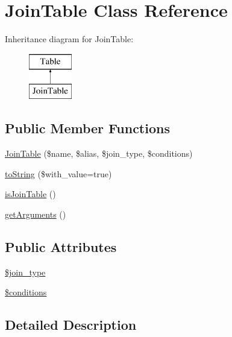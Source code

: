 \hypertarget{classJoinTable}{}\section{Join\+Table Class Reference}
\label{classJoinTable}
Inheritance diagram for Join\+Table\+:\begin{figure}[H]
\begin{center}
\leavevmode
\includegraphics[height=2.000000cm]{classJoinTable}
\end{center}
\end{figure}
\subsection*{Public Member Functions}
\begin{DoxyCompactItemize}
\item 
\hyperlink{classJoinTable_a70859ad638b9149e97b8209d4f73610e}{Join\+Table} (\$name, \$alias, \$join\+\_\+type, \$conditions)
\item 
\hyperlink{classJoinTable_aa1e393a7b04e3b591ebd0fe6dff46f42}{to\+String} (\$with\+\_\+value=true)
\item 
\hyperlink{classJoinTable_aa26630df96bb0dac2ddcccff34c91530}{is\+Join\+Table} ()
\item 
\hyperlink{classJoinTable_a2f8aae7c1c5d0879f1085b9280018b4e}{get\+Arguments} ()
\end{DoxyCompactItemize}
\subsection*{Public Attributes}
\begin{DoxyCompactItemize}
\item 
\hyperlink{classJoinTable_a00c6a8c44beb3b85c9f3a3e5be03fba8}{\$join\+\_\+type}
\item 
\hyperlink{classJoinTable_aeaff6b550d1e29eef836ed19a8d65a99}{\$conditions}
\end{DoxyCompactItemize}


\subsection{Detailed Description}


